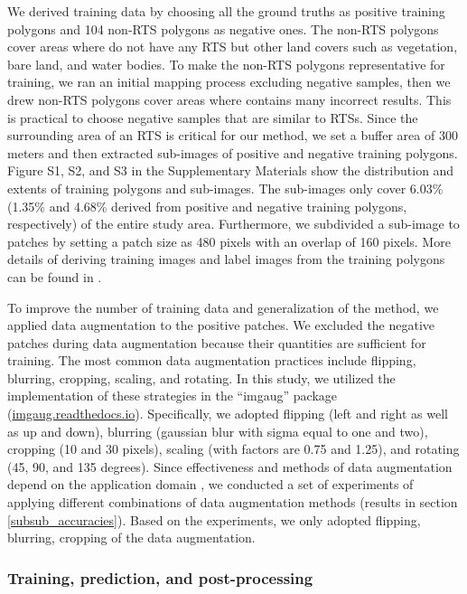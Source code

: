 \documentclass[preprint,12pt,authoryear]{elsarticle}
\begin{document}
We derived training data by choosing all the ground truths as positive training polygons and 104 non-RTS polygons as negative ones. The non-RTS polygons cover areas where do not have any RTS but other land covers such as vegetation, bare land, and water bodies. To make the non-RTS polygons representative for training, we ran an initial mapping process excluding negative samples, then we drew non-RTS polygons cover areas where contains many incorrect results. This is practical to choose negative samples that are similar to RTSs. Since the surrounding area of an RTS is critical for our method, we set a buffer area of 300 meters and then extracted sub-images of positive and negative training polygons. Figure S1, S2, and S3 in the Supplementary Materials show the distribution and extents of training polygons and sub-images. The sub-images only cover 6.03\% (1.35\% and 4.68\% derived from positive and negative training polygons, respectively) of the entire study area. Furthermore, we subdivided a sub-image to patches by setting a patch size as 480 pixels with an overlap of 160 pixels. More details of deriving training images and label images from the training polygons can be found in \cite{huang2018automatic}. 


To improve the number of training data and generalization of the method, we applied data augmentation to the positive patches. We excluded the negative patches during data augmentation because their quantities are sufficient for training. The most common data augmentation practices include flipping, blurring, cropping, scaling, and rotating. In this study, we utilized the implementation of these strategies in the “imgaug” package (\url{imgaug.readthedocs.io}). Specifically, we adopted flipping (left and right as well as up and down), blurring (gaussian blur with sigma equal to one and two), cropping (10 and 30 pixels), scaling (with factors are 0.75 and 1.25), and rotating (45, 90, and 135 degrees). Since effectiveness and methods of data augmentation depend on the application domain \citep{perez2017effectiveness}, we conducted a set of experiments of applying different combinations of data augmentation methods (results in section \ref{subsub_accuracies}). Based on the experiments, we only adopted flipping, blurring, cropping of the data augmentation. 

\subsubsection{Training, prediction, and post-processing}
\label{subsubsec_deeplab}
\end{document}
